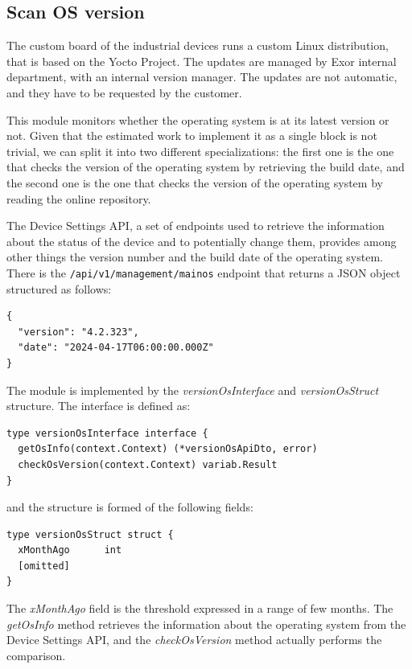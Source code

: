 \subsection{Scan OS version}

The custom board of the industrial devices runs a custom Linux distribution, that is based on the Yocto Project. The updates are managed by Exor internal department, with an internal version manager. The updates are not automatic, and they have to be requested by the customer.

This module monitors whether the operating system is at its latest version or not. Given that the estimated work to implement it as a single block is not trivial, we can split it into two different specializations: the first one is the one that checks the version of the operating system by retrieving the build date, and the second one is the one that checks the version of the operating system by reading the online repository.

The Device Settings API, a set of endpoints used to retrieve the information about the status of the device and to potentially change them, provides among other things the version number and the build date of the operating system. There is the \texttt{/api/v1/management/mainos} endpoint that returns a JSON object structured as follows:

\begin{lstlisting}
{
  "version": "4.2.323",
  "date": "2024-04-17T06:00:00.000Z"
}
\end{lstlisting}

The module is implemented by the \textit{versionOsInterface} and \textit{versionOsStruct} structure. The interface is defined as:

\begin{lstlisting}[style=golang]
type versionOsInterface interface {
  getOsInfo(context.Context) (*versionOsApiDto, error)
  checkOsVersion(context.Context) variab.Result
}
\end{lstlisting}

and the structure is formed of the following fields:

\begin{lstlisting}[style=golang]
type versionOsStruct struct {
  xMonthAgo      int
  [omitted]
}
\end{lstlisting}

The \textit{xMonthAgo} field is the threshold expressed in a range of few months. The \textit{getOsInfo} method retrieves the information about the operating system from the Device Settings API, and the \textit{checkOsVersion} method actually performs the comparison.

